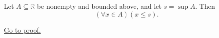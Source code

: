 \begin{proposition}
\label{prop:every-element-lies-below-the-supremum}
Let $A\subseteq\mathbb{R}$ be nonempty and bounded above, and let
$s=\sup A$. Then
\[
  (\forall x\in A)(x\leq s).
\]

\hyperref[prf:every-element-lies-below-the-supremum]{Go to proof.}
\end{proposition}